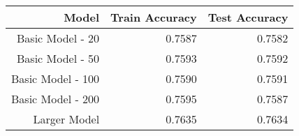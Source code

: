 \begin{tabular}{|r||r|r|}
\hline
Model & Train Accuracy & Test Accuracy \\
\hline
Basic Model - 20 & 0.7587 & 0.7582 \\
Basic Model - 50 & 0.7593 & 0.7592 \\
Basic Model - 100 & 0.7590 & 0.7591 \\
Basic Model - 200 & 0.7595 & 0.7587 \\
Larger Model & 0.7635 & 0.7634 \\
\hline
\end{tabular}
